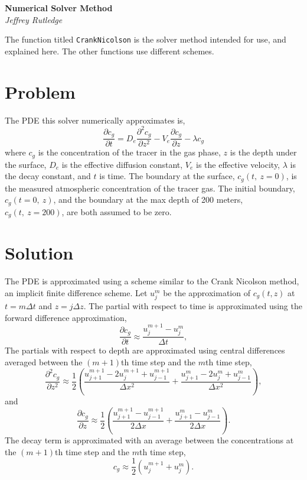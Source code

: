 \documentclass[11pt, letterpaper]{article}
\begin{document}
{\Large \bf Numerical Solver Method} \\
{\small \it Jeffrey Rutledge}

The function titled \texttt{CrankNicolson} is the solver method intended for use, and explained here.
The other functions use different schemes.

\section*{Problem}

The PDE this solver numerically approximates is,
\[
    \frac{\partial c_g}{\partial t} = D_e \frac{\partial^2 c_g}{\partial z^2} - V_e \frac{\partial c_g}{\partial z} - \lambda c_g
\]
where $c_g$ is the concentration of the tracer in the gas phase, $z$ is the depth under the surface, $D_e$ is the effective diffusion constant, $V_e$ is the effective velocity, $\lambda$ is the decay constant, and $t$ is time.
The boundary at the surface, $c_g(t,\ z = 0)$, is the measured atmospheric concentration of the tracer gas.
The initial boundary, $c_g(t = 0,\ z)$, and the boundary at the max depth of 200 meters, $c_g(t,\ z = 200)$, are both assumed to be zero.

\section*{Solution}
The PDE is approximated using a scheme similar to the Crank Nicolson method, an implicit finite difference scheme.
Let $u^m_j$ be the approximation of $c_g(t, z)$ at $t = m \Delta t$ and $z = j \Delta z$.
The partial with respect to time is approximated using the forward difference approximation,
\[
    \frac{\partial c_g}{\partial t} \approx \frac{u^{m + 1}_j - u^m_j}{\Delta t},
\]
The partials with respect to depth are approximated using central differences averaged between the $(m + 1)$th time step and the $m$th time step,
\[
    \frac{\partial^2 c_g}{\partial z^2} \approx \frac{1}{2} \left(
        \frac{u^{m + 1}_{j + 1} - 2u^{m + 1}_j + u^{m + 1}_{j - 1}}{\Delta x^2} +
    \frac{u^{m}_{j + 1} - 2u^{m}_j + u^{m}_{j - 1}}{\Delta x^2} \right),
\]
and
\[
    \frac{\partial c_g}{\partial z} \approx \frac{1}{2} \left(
        \frac{u^{m + 1}_{j + 1} - u^{m + 1}_{j - 1}}{2\Delta x} +
    \frac{u^{m}_{j + 1} - u^{m}_{j - 1}}{2\Delta x} \right).
\]
The decay term is approximated with an average between the concentrations at the $(m + 1)$th time step and the $m$th time step,
\[
    c_g \approx \frac{1}{2} \left( u^{m+1}_{j} + u^m_j \right).
\]
\end{document}
